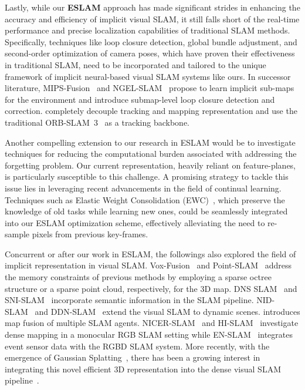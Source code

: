 Lastly, while our \textbf{ESLAM} approach has made significant strides in enhancing the accuracy and efficiency of implicit visual SLAM, it still falls short of the real-time performance and precise localization capabilities of traditional SLAM methods. Specifically, techniques like loop closure detection, global bundle adjustment, and second-order optimization of camera poses, which have proven their effectiveness in traditional SLAM, need to be incorporated and tailored to the unique framework of implicit neural-based visual SLAM systems like ours. In successor literature, MIPS-Fusion~\citep{tang2023mips} and NGEL-SLAM~\citep{mao2023ngel} propose to learn implicit sub-maps for the environment and introduce submap-level loop closure detection and correction. \cite{haghighi2023neural} completely decouple tracking and mapping representation and use the traditional ORB-SLAM~3~\citep{campos2021orb} as a tracking backbone.

Another compelling extension to our research in ESLAM would be to investigate techniques for reducing the computational burden associated with addressing the forgetting problem. Our current representation, heavily reliant on feature-planes, is particularly susceptible to this challenge. A promising strategy to tackle this issue lies in leveraging recent advancements in the field of continual learning. Techniques such as  Elastic Weight Consolidation (EWC)~\citep{kirkpatrick2017overcoming}, which preserve the knowledge of old tasks while learning new ones, could be seamlessly integrated into our ESLAM optimization scheme, effectively alleviating the need to re-sample pixels from previous key-frames.

Concurrent or after our work in ESLAM, the followings also explored the field of implicit representation in visual SLAM. Vox-Fusion~\citep{yang2022vox} and Point-SLAM~\citep{sandstrom2023point} address the memory constraints of previous methods by employing a sparse octree structure or a sparse point cloud, respectively, for the 3D map. DNS SLAM~\citep{li2023dns} and SNI-SLAM~\citep{zhu2023sni} incorporate semantic information in the SLAM pipeline. NID-SLAM~\cite{xu2024nid} and DDN-SLAM~\citep{li2024ddn} extend the visual SLAM to dynamic scenes. \cite{liu2023efficient} introduces map fusion of multiple SLAM agents. NICER-SLAM~\citep{zhu2023nicer} and HI-SLAM~\citep{zhang2023hi} investigate dense mapping in a monocular RGB SLAM setting while EN-SLAM~\citep{qu2023implicit} integrates event sensor data with the RGBD SLAM system. More recently, with the emergence of Gaussian Splatting~\citep{kerbl20233d}, there has been a growing interest in integrating this novel efficient 3D representation into the dense visual SLAM pipeline~\citep{matsuki2023gaussian,yan2023gs,yugay2023gaussian,keetha2023splatam,huang2023photo}.

